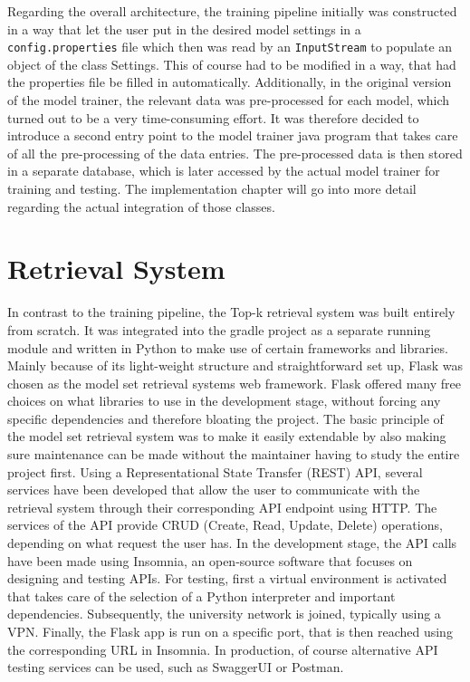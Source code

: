 Regarding the overall architecture, the training pipeline initially was constructed in a way that let the user put in the desired model settings in a \texttt{config.properties} file which then was read by an \texttt{InputStream} to populate an object of the class Settings. This of course had to be modified in a way, that had the properties file be filled in automatically. Additionally, in the original version of the model trainer, the relevant data was pre-processed for each model, which turned out to be a very time-consuming effort. It was therefore decided to introduce a second entry point to the model trainer java program that takes care of all the pre-processing of the data entries. The pre-processed data is then stored in a separate database, which is later accessed by the actual model trainer for training and testing. The implementation chapter will go into more detail regarding the actual integration of those classes.

\section{Retrieval System}

In contrast to the training pipeline, the Top-k retrieval system was built entirely from scratch. It was integrated into the gradle project as a separate running module and written in Python to make use of certain frameworks and libraries. Mainly because of its light-weight structure and straightforward set up, Flask was chosen as the model set retrieval systems web framework. Flask offered many free choices on what libraries to use in the development stage, without forcing any specific dependencies and therefore bloating the project. The basic principle of the model set retrieval system was to make it easily extendable by also making sure maintenance can be made without the maintainer having to study the entire project first. Using a Representational State Transfer (REST) API, several services have been developed that allow the user to communicate with the retrieval system through their corresponding API endpoint using HTTP. The services of the API provide CRUD (Create, Read, Update, Delete) operations, depending on what request the user has. In the development stage, the API calls have been made using Insomnia, an open-source software that focuses on designing and testing APIs. For testing, first a virtual environment is activated that takes care of the selection of a Python interpreter and important dependencies. Subsequently, the university network is joined, typically using a VPN. Finally, the Flask app is run on a specific port, that is then reached using the corresponding URL in Insomnia. In production, of course alternative API testing services can be used, such as SwaggerUI or Postman.

